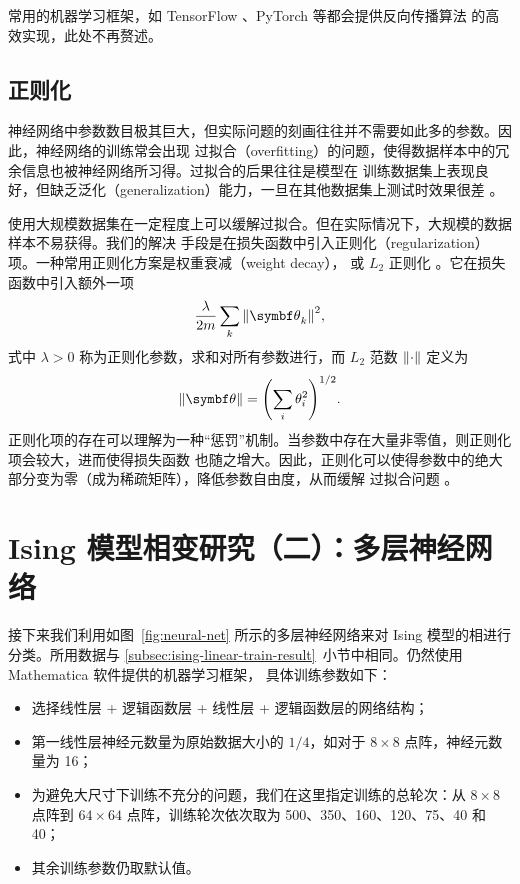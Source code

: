 常用的机器学习框架，如 TensorFlow \cite{tensorflow}、PyTorch \cite{pytorch} 等都会提供反向传播算法
的高效实现，此处不再赘述。

\subsection{正则化}
\label{subsec:regularization}

神经网络中参数数目极其巨大，但实际问题的刻画往往并不需要如此多的参数。因此，神经网络的训练常会出现
过拟合（overfitting）的问题，使得数据样本中的冗余信息也被神经网络所习得。过拟合的后果往往是模型在
训练数据集上表现良好，但缺乏泛化（generalization）能力，一旦在其他数据集上测试时效果很差
\cite{zhouzhihua}。

使用大规模数据集在一定程度上可以缓解过拟合。但在实际情况下，大规模的数据样本不易获得。我们的解决
手段是在损失函数中引入正则化（regularization）项。一种常用正则化方案是权重衰减（weight decay），
或 $L_2$ 正则化 \cite{goodfellow2016deep}。它在损失函数中引入额外一项
\begin{equation}
  \frac{\lambda}{2m} \sum_k \norm{\bm{\theta}_k}^2,
\end{equation}
式中 $\lambda>0$ 称为正则化参数，求和对所有参数进行，而 $L_2$ 范数 $\norm{\cdot}$ 定义为
\begin{equation}
  \norm{\bm{\theta}} = \qty(\sum_i \theta_i^2)^{1/2}.
\end{equation}
正则化项的存在可以理解为一种“惩罚”机制。当参数中存在大量非零值，则正则化项会较大，进而使得损失函数
也随之增大。因此，正则化可以使得参数中的绝大部分变为零（成为稀疏矩阵），降低参数自由度，从而缓解
过拟合问题 \cite{goodfellow2016deep,zhouzhihua}。

\section{Ising 模型相变研究（二）：多层神经网络}

接下来我们利用如图~\ref{fig:neural-net} 所示的多层神经网络来对 Ising 模型的相进行分类。所用数据与
\ref{subsec:ising-linear-train-result}~小节中相同。仍然使用 Mathematica 软件提供的机器学习框架，
具体训练参数如下：

\begin{itemize}
  \item 选择线性层 + 逻辑函数层 + 线性层 + 逻辑函数层的网络结构；
  \item 第一线性层神经元数量为原始数据大小的 $1/4$，如对于 $8 \times 8$ 点阵，神经元数量为 16；
  \item 为避免大尺寸下训练不充分的问题，我们在这里指定训练的总轮次：从 $8 \times 8$ 点阵到
    $64 \times 64$ 点阵，训练轮次依次取为 500、350、160、120、75、40 和 40；
  \item 其余训练参数仍取默认值。
\end{itemize}

